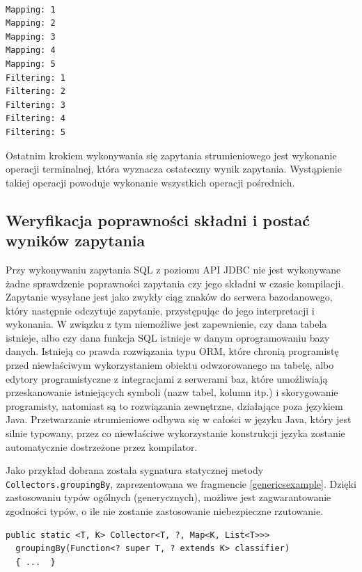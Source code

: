 \documentclass[12pt,twoside,openright]{extarticle}
\begin{document}
\begin{verbatim}

Mapping: 1
Mapping: 2
Mapping: 3
Mapping: 4
Mapping: 5
Filtering: 1
Filtering: 2
Filtering: 3
Filtering: 4
Filtering: 5

\end{verbatim}

    Ostatnim krokiem wykonywania się zapytania strumieniowego jest wykonanie operacji terminalnej, która wyznacza ostateczny wynik zapytania. Wystąpienie takiej operacji powoduje wykonanie wszystkich operacji pośrednich. 

\subsection{Weryfikacja poprawności składni i postać wyników zapytania}

    Przy wykonywaniu zapytania SQL z poziomu API JDBC nie jest wykonywane żadne sprawdzenie poprawności zapytania czy jego składni w czasie kompilacji. Zapytanie wysyłane jest jako zwykły ciąg znaków do serwera bazodanowego, który następnie odczytuje zapytanie, przystępując do jego interpretacji i wykonania. W związku z tym niemożliwe jest zapewnienie, czy dana tabela istnieje, albo czy dana funkcja SQL istnieje w danym oprogramowaniu bazy danych. Istnieją co prawda rozwiązania typu ORM, które chronią programistę przed niewłaściwym wykorzystaniem obiektu odwzorowanego na tabelę, albo edytory programistyczne z integracjami z serwerami baz, które umożliwiają przeskanowanie istniejących symboli (nazw tabel, kolumn itp.) i skorygowanie programisty, natomiast są to rozwiązania zewnętrzne, działające poza językiem Java. Przetwarzanie strumieniowe odbywa się w całości w języku Java, który jest silnie typowany, przez co niewłaściwe wykorzystanie konstrukcji języka zostanie automatycznie dostrzeżone przez kompilator.
    
    Jako przykład dobrana została sygnatura statycznej metody \newline \texttt{Collectors.groupingBy}, zaprezentowana we fragmencie \ref{genericsexample}. Dzięki zastosowaniu typów ogólnych \cite{generics} (generycznych), możliwe jest zagwarantowanie zgodności typów, o ile nie zostanie zastosowanie niebezpieczne rzutowanie.

\begin{lstlisting}[label=genericsexample, caption=Sygnatura metody grupującej]
  public static <T, K> Collector<T, ?, Map<K, List<T>>>
  groupingBy(Function<? super T, ? extends K> classifier) 
  { ...  }
\end{lstlisting}
\end{document}
